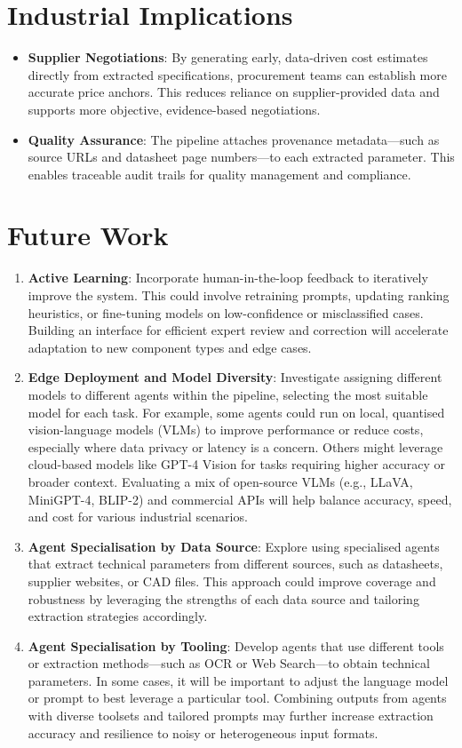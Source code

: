 \section{Industrial Implications}
\begin{itemize}
  \item \textbf{Supplier Negotiations}: By generating early, data-driven cost estimates directly from extracted specifications, procurement teams can establish more accurate price anchors. This reduces reliance on supplier-provided data and supports more objective, evidence-based negotiations.
  \item \textbf{Quality Assurance}: The pipeline attaches provenance metadata—such as source URLs and datasheet page numbers—to each extracted parameter. This enables traceable audit trails for quality management and compliance.
\end{itemize}

\section{Future Work}
\begin{enumerate}
  \item \textbf{Active Learning}: Incorporate human-in-the-loop feedback to iteratively improve the system. This could involve retraining prompts, updating ranking heuristics, or fine-tuning models on low-confidence or misclassified cases. Building an interface for efficient expert review and correction will accelerate adaptation to new component types and edge cases.
  \item \textbf{Edge Deployment and Model Diversity}: Investigate assigning different models to different agents within the pipeline, selecting the most suitable model for each task. For example, some agents could run on local, quantised vision-language models (VLMs) to improve performance or reduce costs, especially where data privacy or latency is a concern. Others might leverage cloud-based models like GPT-4 Vision for tasks requiring higher accuracy or broader context. Evaluating a mix of open-source VLMs (e.g., LLaVA, MiniGPT-4, BLIP-2) and commercial APIs will help balance accuracy, speed, and cost for various industrial scenarios.
  \item \textbf{Agent Specialisation by Data Source}: Explore using specialised agents that extract technical parameters from different sources, such as datasheets, supplier websites, or CAD files. This approach could improve coverage and robustness by leveraging the strengths of each data source and tailoring extraction strategies accordingly.
  \item \textbf{Agent Specialisation by Tooling}: Develop agents that use different tools or extraction methods—such as OCR or Web Search—to obtain technical parameters. In some cases, it will be important to adjust the language model or prompt to best leverage a particular tool. Combining outputs from agents with diverse toolsets and tailored prompts may further increase extraction accuracy and resilience to noisy or heterogeneous input formats.
\end{enumerate}

